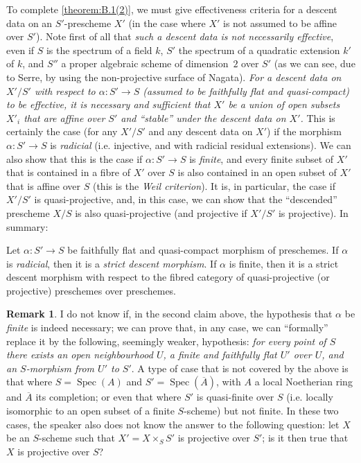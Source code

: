 \documentclass{article}
\theoremstyle{plain}
\newenvironment{theorem}[1]
  {\renewcommand\theinnercustomtheorem{#1}\innercustomtheorem}
  {\endinnercustomtheorem}
\theoremstyle{definition}
\newtheorem*{remark}{Remark}
\DeclareMathOperator{\Spec}{Spec}
\newcommand{\oldpage}[1]{\marginpar{\footnotesize$\Big\vert$ \textit{p.~#1}}}
\begin{document}
To complete \cref{theorem:B.1(2)}, we must give effectiveness criteria for a descent data on an $S'$-prescheme $X'$ (in the case where $X'$ is not assumed to be affine over $S'$).
Note first of all that \emph{such a descent data is not necessarily effective}, even if $S$ is the spectrum of a field $k$, $S'$ the spectrum of a quadratic extension $k'$ of $k$, and $S''$ a proper algebraic scheme of dimension~$2$ over $S'$ (as we can see, due to Serre, by using the non-projective surface of Nagata).
\emph{For a descent data on $X'/S'$ with respect to $\alpha\colon S'\to S$ (assumed to be faithfully flat and quasi-compact) to be effective, it is necessary and sufficient that $X'$ be a union of open subsets $X'_i$ that are affine over $S'$ and ``stable'' under the descent data on $X'$.}
This is certainly the case (for any $X'/S'$ and any descent data on $X'$) if the morphism $\alpha\colon S'\to S$ is \emph{radicial} (i.e. injective, and with
\oldpage{190-20}
radicial residual extensions).
We can also show that this is the case if $\alpha\colon S'\to S$ is \emph{finite}, and every finite subset of $X'$ that is contained in a fibre of $X'$ over $S$ is also contained in an open subset of $X'$ that is affine over $S$ (this is the \emph{Weil criterion}).
It is, in particular, the case if $X'/S'$ is quasi-projective, and, in this case, we can show that the ``descended'' prescheme $X/S$ is also quasi-projective (and projective if $X'/S'$ is projective).
In summary:

\begin{theorem}{3}
\label{theorem:B.1(3)}
  Let $\alpha\colon S'\to S$ be faithfully flat and quasi-compact morphism of preschemes.
  If $\alpha$ is \emph{radicial}, then it is a \emph{strict descent morphism}.
  If $\alpha$ is finite, then it is a strict descent morphism with respect to the fibred category of quasi-projective (or projective) preschemes over preschemes.
\end{theorem}

\begin{remark}
  I do not know if, in the second claim above, the hypothesis that $\alpha$ be \emph{finite} is indeed necessary;
  we can prove that, in any case, we can ``formally'' replace it by the following, seemingly weaker, hypothesis:
  \emph{for every point of $S$ there exists an open neighbourhood $U$, a finite and faithfully flat $U'$ over $U$, and an $S$-morphism from $U'$ to $S'$}.
  A type of case that is not covered by the above is that where $S=\Spec(A)$ and $S'=\Spec(\overline{A})$, with $A$ a local Noetherian ring and $\overline{A}$ its completion;
  or even that where $S'$ is quasi-finite over $S$ (i.e. locally isomorphic to an open subset of a finite $S$-scheme) but not finite.
  In these two cases, the speaker also does not know the answer to the following question:
  let $X$ be an $S$-scheme such that $X'=X\times_S S'$ is projective over $S'$;
  is it then true that $X$ is projective over $S$?
\end{remark}
\end{document}
